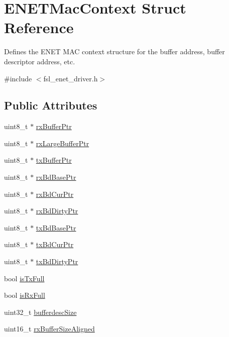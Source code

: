 \hypertarget{structENETMacContext}{}\section{E\+N\+E\+T\+Mac\+Context Struct Reference}
\label{structENETMacContext}


Defines the E\+N\+ET M\+AC context structure for the buffer address, buffer descriptor address, etc.  




{\ttfamily \#include $<$fsl\+\_\+enet\+\_\+driver.\+h$>$}

\subsection*{Public Attributes}
\begin{DoxyCompactItemize}
\item 
uint8\+\_\+t $\ast$ \hyperlink{structENETMacContext_a06a24caa26fd7269f59ee182c951d687}{rx\+Buffer\+Ptr}
\item 
uint8\+\_\+t $\ast$ \hyperlink{structENETMacContext_adc4c623fb65846cfe36082133144dd1f}{rx\+Large\+Buffer\+Ptr}
\item 
uint8\+\_\+t $\ast$ \hyperlink{structENETMacContext_a4ef76663fb63a619dfea2b2269ce444f}{tx\+Buffer\+Ptr}
\item 
uint8\+\_\+t $\ast$ \hyperlink{structENETMacContext_a3da8d4131cc9deb3f08a078d27d7913c}{rx\+Bd\+Base\+Ptr}
\item 
uint8\+\_\+t $\ast$ \hyperlink{structENETMacContext_a7bcc90b2e020d340626ed190a275dabe}{rx\+Bd\+Cur\+Ptr}
\item 
uint8\+\_\+t $\ast$ \hyperlink{structENETMacContext_a710fe2c01d4b49dde272cee307a17ae5}{rx\+Bd\+Dirty\+Ptr}
\item 
uint8\+\_\+t $\ast$ \hyperlink{structENETMacContext_a64745c164bca90c5a763c976669f380e}{tx\+Bd\+Base\+Ptr}
\item 
uint8\+\_\+t $\ast$ \hyperlink{structENETMacContext_a13579478c98974868f1dd1d0b2a31455}{tx\+Bd\+Cur\+Ptr}
\item 
uint8\+\_\+t $\ast$ \hyperlink{structENETMacContext_aef7d23d7e944f9d916fc272c88b1189b}{tx\+Bd\+Dirty\+Ptr}
\item 
bool \hyperlink{structENETMacContext_a499f949b9364e7fec85acc5ad192c4ef}{is\+Tx\+Full}
\item 
bool \hyperlink{structENETMacContext_af7869528012536cd911b67b1f6e2228b}{is\+Rx\+Full}
\item 
uint32\+\_\+t \hyperlink{structENETMacContext_a7863bb1f5c2c1a2b4990732b603d4224}{bufferdesc\+Size}
\item 
uint16\+\_\+t \hyperlink{structENETMacContext_a4245b98c8ec044c3d2b46e6be14cc67f}{rx\+Buffer\+Size\+Aligned}
\end{DoxyCompactItemize}


